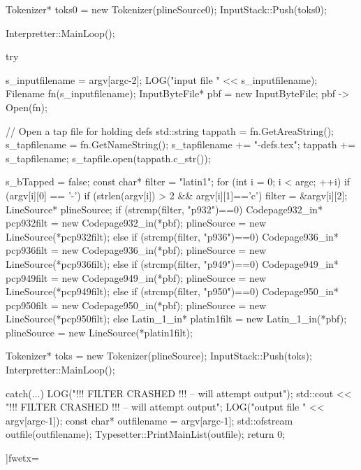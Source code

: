 {{{{{{{{{{{{{   Tokenizer* toks0 = new Tokenizer(plineSource0);
   InputStack::Push(toks0);

   Interpretter::MainLoop();

   try{
      s_inputfilename = argv[argc-2];
      LOG("\nReading input file " << s_inputfilename);
      Filename fn(s_inputfilename);
      InputByteFile* pbf = new InputByteFile;
      pbf -> Open(fn);

      // Open a tap file for holding defs
      std::string tappath = fn.GetAreaString();
      s_tapfilename = fn.GetNameString();
      s_tapfilename += "-defs.tex";
      tappath += s_tapfilename;
      s_tapfile.open(tappath.c_str());

      s_bTapped = false;
      const char* filter = "latin1";
      for (int i = 0; i < argc; ++i){
         if (argv[i][0] == '-'){
            if (strlen(argv[i]) > 2 && argv[i][1]=='c'){
              filter = &argv[i][2];
            }
         }
      }
      LineSource* plineSource;
      if (strcmp(filter, "p932")==0){
         Codepage932_in*  pcp932filt = new Codepage932_in(*pbf);
         plineSource = new LineSource(*pcp932filt);
      }else if (strcmp(filter, "p936")==0){
         Codepage936_in*  pcp936filt = new Codepage936_in(*pbf);
         plineSource = new LineSource(*pcp936filt);
      }else if (strcmp(filter, "p949")==0){
         Codepage949_in*  pcp949filt = new Codepage949_in(*pbf);
         plineSource = new LineSource(*pcp949filt);
      }else if (strcmp(filter, "p950")==0){
         Codepage950_in*  pcp950filt = new Codepage950_in(*pbf);
         plineSource = new LineSource(*pcp950filt);
      }else{
         Latin_1_in* platin1filt = new Latin_1_in(*pbf);
         plineSource = new LineSource(*platin1filt);
      }

      Tokenizer* toks = new Tokenizer(plineSource);
      InputStack::Push(toks);
      Interpretter::MainLoop();
   }
   catch(...){
      LOG("\n!!! FILTER CRASHED !!! -- will attempt output");
      std::cout << "\n!!! FILTER CRASHED !!! -- will attempt output";
   }
   LOG("\nWriting output file " << argv[argc-1]);
   const char* outfilename = argv[argc-1];
   std::ofstream outfile(outfilename);
   Typesetter::PrintMainList(outfile);
   return 0;
}

]fwetx=%
\fwcdef 
\fwbeginmacronotes
{}
\fwendmacronotes
\fwendmacro




}}}}}}}}}}}}
